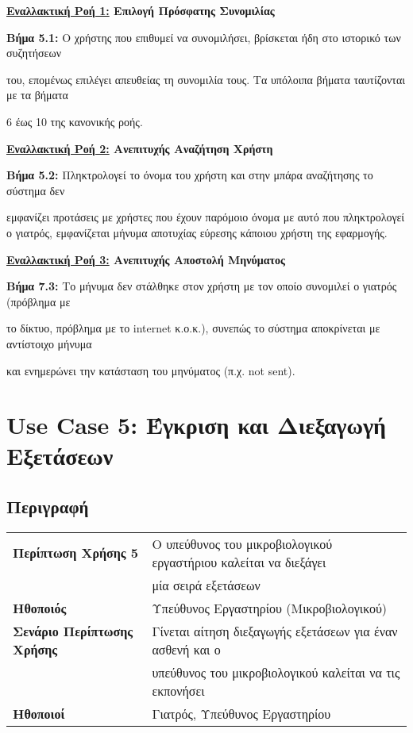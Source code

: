 \documentclass{article}
\newcommand\T{\rule{0pt}{2.6ex}}       %
\newcommand\B{\rule[-1.2ex]{0pt}{0pt}}
\begin{document}
\textbf{\underline{Εναλλακτική Ροή 1:} Επιλογή Πρόσφατης Συνομιλίας} \vspace{0.2cm}
\par\textbf{Βήμα 5.1:} Ο χρήστης που επιθυμεί να συνομιλήσει, βρίσκεται ήδη στο ιστορικό των συζητήσεων \par του, επομένως επιλέγει απευθείας τη συνομιλία τους. Τα υπόλοιπα βήματα ταυτίζονται με τα βήματα \par 6 έως 10 της κανονικής ροής. \vspace{0.2cm}

\textbf{\underline{Εναλλακτική Ροή 2:} Ανεπιτυχής Αναζήτηση Χρήστη} \vspace{0.2cm}
\par \textbf{Βήμα 5.2:} Πληκτρολογεί το όνομα του χρήστη και στην μπάρα αναζήτησης το σύστημα δεν \par εμφανίζει προτάσεις με χρήστες που έχουν παρόμοιο όνομα με αυτό που πληκτρολογεί ο γιατρός,  εμφανίζεται μήνυμα αποτυχίας εύρεσης κάποιου χρήστη της εφαρμογής.  \vspace{0.2cm}

\textbf{\underline{Εναλλακτική Ροή 3:} Ανεπιτυχής Αποστολή Μηνύματος} \vspace{0.2cm}
\par \textbf{Βήμα 7.3:} Το μήνυμα δεν στάλθηκε στον χρήστη με τον οποίο συνομιλεί ο γιατρός (πρόβλημα με \par το δίκτυο, πρόβλημα με το internet κ.ο.κ.), συνεπώς το σύστημα αποκρίνεται με αντίστοιχο μήνυμα \par και ενημερώνει την κατάσταση του μηνύματος (π.χ. not sent).

\section{Use Case 5: Έγκριση και Διεξαγωγή Εξετάσεων}

\subsection{Περιγραφή}

\begin{center}
     \begin{tabular}{|l|l|}
     \hline
      \textbf{Περίπτωση Χρήσης 5} & Ο υπεύθυνος του μικροβιολογικού εργαστήριου καλείται να διεξάγει\T\\& μία σειρά εξετάσεων\B \\ 
      \hline
      \textbf{Ηθοποιός} & Υπεύθυνος Εργαστηρίου (Μικροβιολογικού) \T\B \\
      \hline
      \textbf{Σενάριο Περίπτωσης Χρήσης} & Γίνεται αίτηση διεξαγωγής εξετάσεων για έναν ασθενή και ο \T \\& υπεύθυνος του μικροβιολογικού καλείται να τις εκπονήσει \B \\
      \hline
      \textbf{Ηθοποιοί} & Γιατρός, Υπεύθυνος Εργαστηρίου \T\B \\
      \hline
     \end{tabular}
 \end{center}
 
\end{document}
